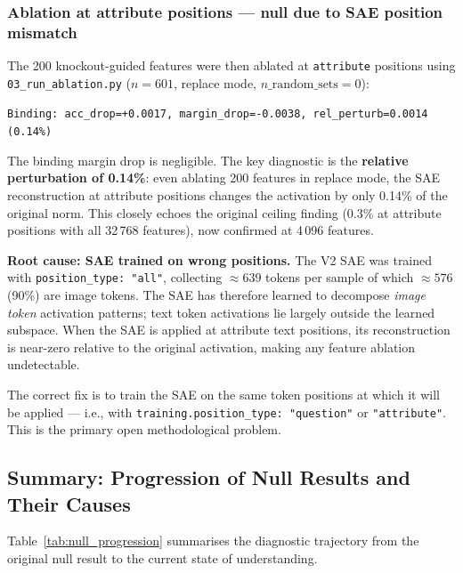 \documentclass[11pt,a4paper]{article}
\begin{document}
\subsubsection{Ablation at attribute positions — null due to SAE position mismatch}

The 200 knockout-guided features were then ablated at \texttt{attribute} positions
using \texttt{03\_run\_ablation.py} ($n = 601$, replace mode, $n\_\text{random\_sets} = 0$):

\begin{center}
\texttt{Binding: acc\_drop=+0.0017, margin\_drop=-0.0038, rel\_perturb=0.0014 (0.14\%)}
\end{center}

The binding margin drop is negligible. The key diagnostic is the \textbf{relative perturbation of
0.14\%}: even ablating 200 features in replace mode, the SAE reconstruction at attribute positions
changes the activation by only 0.14\% of the original norm.
This closely echoes the original ceiling finding (0.3\% at attribute positions with all 32\,768
features), now confirmed at 4\,096 features.

\textbf{Root cause: SAE trained on wrong positions.}
The V2 SAE was trained with \texttt{position\_type: "all"}, collecting $\approx 639$ tokens per
sample of which $\approx 576$ (90\%) are image tokens.
The SAE has therefore learned to decompose \emph{image token} activation patterns; text token
activations lie largely outside the learned subspace.
When the SAE is applied at attribute text positions, its reconstruction is near-zero relative to
the original activation, making any feature ablation undetectable.

The correct fix is to train the SAE on the same token positions at which it will be applied —
i.e., with \texttt{training.position\_type: "question"} or \texttt{"attribute"}.
This is the primary open methodological problem.

\subsection{Summary: Progression of Null Results and Their Causes}

Table~\ref{tab:null_progression} summarises the diagnostic trajectory from the original null result
to the current state of understanding.
\end{document}
